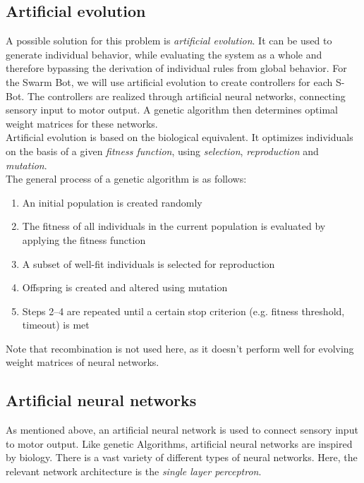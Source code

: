 \subsection{Artificial evolution}
A possible solution for this problem is \emph{artificial evolution}. It can be used to generate individual behavior, while evaluating the system as a whole and therefore bypassing the derivation of individual rules from global behavior. For the Swarm Bot, we will use artificial evolution to create controllers for each S-Bot. The controllers are realized through artificial neural networks, connecting sensory input to motor output. A genetic algorithm then determines optimal weight matrices for these networks.\\
Artificial evolution is based on the biological equivalent. It optimizes individuals on the basis of a given \emph{fitness function}, using \emph{selection}, \emph{reproduction} and \emph{mutation}. \cite[pp. 37--69]{eiben03genetic}\\
The general process of a genetic algorithm is as follows:
\begin{enumerate}
	\item An initial population is created randomly
	\item The fitness of all individuals in the current population is evaluated by applying the fitness function
	\item A subset of well-fit individuals is selected for reproduction
	\item Offspring is created and altered using mutation
	\item Steps 2--4 are repeated until a certain stop criterion (e.g. fitness threshold, timeout) is met
\end{enumerate}
Note that recombination is not used here, as it doesn't perform well for evolving weight matrices of neural networks. \cite[pp. 1425--1428]{yao1999evolving}


\subsection{Artificial neural networks}
As mentioned above, an artificial neural network is used to connect sensory input to motor output. Like genetic Algorithms, artificial neural networks are inspired by biology. There is a vast variety of different types of neural networks. Here, the relevant network architecture is the \emph{single layer perceptron}.


